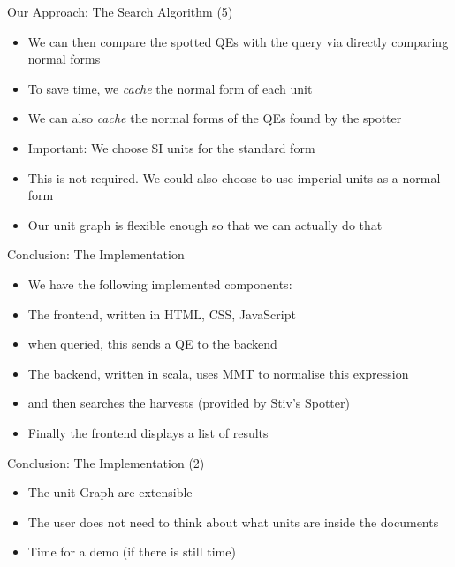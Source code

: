 \documentclass{beamer}
\begin{document}
  \begin{frame}{Our Approach: The Search Algorithm (5)}
    \begin{itemize}[<+->]
      \item We can then compare the spotted QEs with the query via directly comparing normal forms
      \item To save time, we \textit{cache} the normal form of each unit
      \item We can also \textit{cache} the normal forms of the QEs found by the spotter
      \item Important: We choose SI units for the standard form
      \item This is not required. We could also choose to use imperial units as a normal form
      \item Our unit graph is flexible enough so that we can actually do that
    \end{itemize}
  \end{frame}

  \begin{frame}{Conclusion: The Implementation}
    \begin{itemize}[<+->]
      \item We have the following implemented components:
      \item The frontend, written in HTML, CSS, JavaScript
      \item when queried, this sends a QE to the backend
      \item The backend, written in scala, uses MMT to normalise this expression
      \item and then searches the harvests (provided by Stiv's Spotter)
      \item Finally the frontend displays a list of results
    \end{itemize}
  \end{frame}

  \begin{frame}{Conclusion: The Implementation (2)}
    \begin{itemize}[<+->]
      \item The unit Graph are extensible
      \item The user does not need to think about what units are inside the documents
      \item Time for a demo (if there is still time)
    \end{itemize}
  \end{frame}
\end{document}
